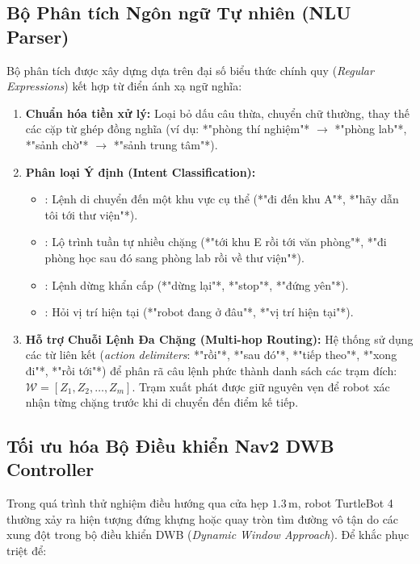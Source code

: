 \subsection{Bộ Phân tích Ngôn ngữ Tự nhiên (NLU Parser)}

Bộ phân tích  được xây dựng dựa trên đại số biểu thức chính quy (\textit{Regular Expressions}) kết hợp từ điển ánh xạ ngữ nghĩa:
\begin{enumerate}
    \item \textbf{Chuẩn hóa tiền xử lý:} Loại bỏ dấu câu thừa, chuyển chữ thường, thay thế các cặp từ ghép đồng nghĩa (ví dụ: *"phòng thí nghiệm"* $\rightarrow$ *"phòng lab"*, *"sảnh chờ"* $\rightarrow$ *"sảnh trung tâm"*).
    \item \textbf{Phân loại Ý định (Intent Classification):}
    \begin{itemize}
        \item {}: Lệnh di chuyển đến một khu vực cụ thể (*"đi đến khu A"*, *"hãy dẫn tôi tới thư viện"*).
        \item {}: Lộ trình tuần tự nhiều chặng (*"tới khu E rồi tới văn phòng"*, *"đi phòng học sau đó sang phòng lab rồi về thư viện"*).
        \item {}: Lệnh dừng khẩn cấp (*"dừng lại"*, *"stop"*, *"đứng yên"*).
        \item {}: Hỏi vị trí hiện tại (*"robot đang ở đâu"*, *"vị trí hiện tại"*).
    \end{itemize}
    \item \textbf{Hỗ trợ Chuỗi Lệnh Đa Chặng (Multi-hop Routing):}
    Hệ thống sử dụng các từ liên kết (\textit{action delimiters}: *"rồi"*, *"sau đó"*, *"tiếp theo"*, *"xong đi"*, *"rồi tới"*) để phân rã câu lệnh phức thành danh sách các trạm đích: $\mathcal{W} = [Z_1, Z_2, \dots, Z_m]$. Trạm xuất phát được giữ nguyên vẹn để robot xác nhận từng chặng trước khi di chuyển đến điểm kế tiếp.
\end{enumerate}

\subsection{Tối ưu hóa Bộ Điều khiển Nav2 DWB Controller}

Trong quá trình thử nghiệm điều hướng qua cửa hẹp $1.3\,\text{m}$, robot TurtleBot 4 thường xảy ra hiện tượng đứng khựng hoặc quay tròn tìm đường vô tận do các xung đột trong bộ điều khiển DWB (\textit{Dynamic Window Approach}). Để khắc phục triệt để:

